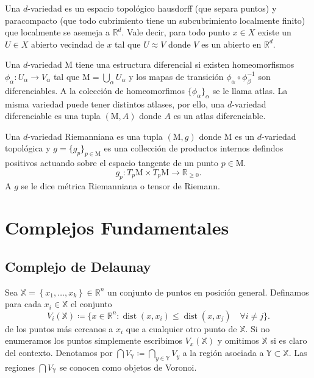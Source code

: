 \documentclass[legalpaper,12pt]{article}
\newcommand{\X}{\mathbb{X}}
\newcommand{\Y}{\mathbb{Y}}
\newcommand{\R}{\mathbb{R}}
\newcommand{\MM}{\mathrm{M}}
\DeclareMathOperator{\dist}{dist}
\begin{document}
Una \(d\)-variedad es un espacio topológico hausdorff (que separa puntos) y paracompacto
(que todo cubrimiento tiene un subcubrimiento localmente finito) que localmente se asemeja
a \(\R^d\). Vale decir, para todo punto \(x\in X\) existe un \(U\in X\) abierto vecindad de \(x\) 
tal que \(U\approx V\) donde \(V\) es un abierto en \(\R^d\).   

Una \(d\)-variedad \(\MM\) tiene una estructura diferencial si existen homeomorfismos
\(\phi_{\alpha} \colon U_{\alpha} \to V_{\alpha}\) tal que \(\MM = \bigcup_{\alpha} U_{\alpha}\)
y los mapas de transición \(\phi_{\alpha}\circ\phi_{\beta}^{-1}\) son diferenciables.
A la colección de homeomorfimos \(\lbrace \phi_{\alpha} \rbrace_{\alpha}\) se le 
llama atlas. La misma variedad puede tener distintos atlases, por ello, una \(d\)-variedad
diferenciable es una tupla \((\MM, A)\) donde \(A\) es un atlas diferenciable.

Una \(d\)-variedad Riemanniana es una tupla \((\MM,g)\) donde \(\MM\) es un \(d\)-variedad topológica
y \(g = \lbrace g_p \rbrace_{p\in \MM}\) es una collección de productos internos defindos positivos
actuando sobre el espacio tangente de un punto \(p\in \MM\).
\begin{displaymath}
  g_p \colon T_p \MM \times T_p \MM \to \R_{\ge 0}.
\end{displaymath}
A \(g\) se le dice métrica Riemanniana o tensor de Riemann. 

\section{Complejos Fundamentales}

\subsection{Complejo de Delaunay}

Sea \(\X = \left\{ x_1, \dots, x_k \right\} \in \R^n\) un conjunto de puntos en posición
general. Definamos para cada \(x_i\in \X\) el conjunto
\begin{displaymath}
  V_i(\X) \coloneqq \lbrace x\in \R^n \colon \dist(x,x_i) \le \dist(x,x_j)\quad \forall i\ne j\rbrace.
\end{displaymath}
de los puntos más cercanos a \(x_i\) que a cualquier otro punto de \(\X\). Si no enumeramos
los puntos simplemente escribimos \(V_{x}(\X)\) y omitimos \(\X\) si es claro del contexto.  
Denotamos por \(\bigcap V_{\Y} \coloneqq \bigcap_{y\in \Y} V_{y}\) a la región asociada
a \(\Y\subset \X\). Las regiones \(\bigcap V_{\Y}\) se conocen como objetos de Voronoi.
\end{document}
